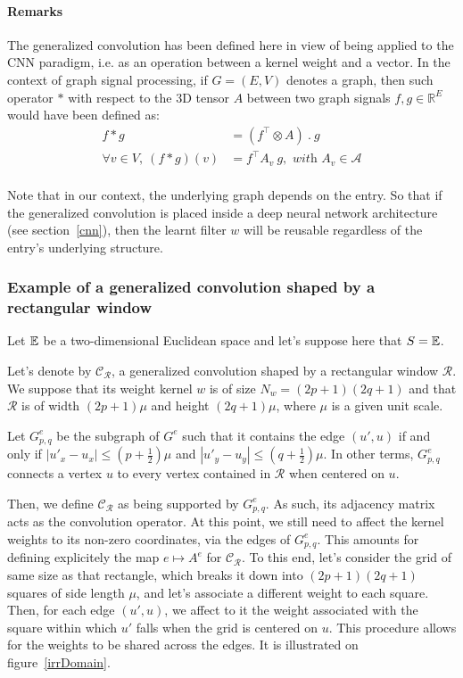   \paragraph{Remarks}

The generalized convolution has been defined here in view of being applied to the CNN paradigm, i.e. as an operation between a kernel weight and a vector. In the context of graph signal processing, if $G=(E,V)$ denotes a graph, then such operator $\ast$ with respect to the 3D tensor $A$ between two graph signals $f, g \in \mathbb{R}^E$ would have been defined as:
\begin{align}
f \ast g &= (f^\top \otimes A)\ .\ g\\
\forall v \in V,\ (f \ast g)(v) &= f^\top A_v\ g, \textit{ with } A_v \in \mathcal{A}
\end{align}\\ 
Note that in our context, the underlying graph depends on the entry. So that if the generalized convolution is placed inside a deep neural network architecture (see section~\ref{cnn}), then the learnt filter $w$ will be reusable regardless of the entry's underlying structure. 

  \subsubsection{Example of a generalized convolution shaped by a rectangular window}
\label{rectangle}

Let $\mathbb{E}$ be a two-dimensional Euclidean space and let's suppose here that $S = \mathbb{E}$.

Let's denote by $\mathcal{C_\mathcal{R}}$, a generalized convolution shaped by a rectangular window $\mathcal{R}$. We suppose that its weight kernel $w$ is of size $N_w = (2p+1)(2q+1)$ and that $\mathcal{R}$ is of width $(2p+1)\mu$ and height $(2q+1)\mu$, where $\mu$ is a given unit scale.

Let $G^e_{p,q}$ be the subgraph of $G^e$ such that it contains the edge $(u',u)$ if and only if $|u'_x-u_x| \leq (p + \frac{1}2)\mu$ and $|u'_y-u_y| \leq (q + \frac{1}2)\mu$. In other terms, $G^e_{p,q}$ connects a vertex $u$ to every vertex contained in $\mathcal{R}$ when centered on $u$.

Then, we define $\mathcal{C_\mathcal{R}}$ as being supported by $G^e_{p,q}$. As such, its adjacency matrix acts as the convolution operator. At this point, we still need to affect the kernel weights to its non-zero coordinates, via the edges of $G^e_{p,q}$. This amounts for defining explicitely the map $e \mapsto A^e$ for $\mathcal{C_\mathcal{R}}$. To this end, let's consider the grid of same size as that rectangle, which breaks it down into $(2p+1)(2q+1)$ squares of side length $\mu$, and let's associate a different weight to each square. Then, for each edge $(u',u)$, we affect to it the weight associated with the square within which $u'$ falls when the grid is centered on $u$. This procedure allows for the weights to be shared across the edges. It is illustrated on figure~\ref{irrDomain}.

